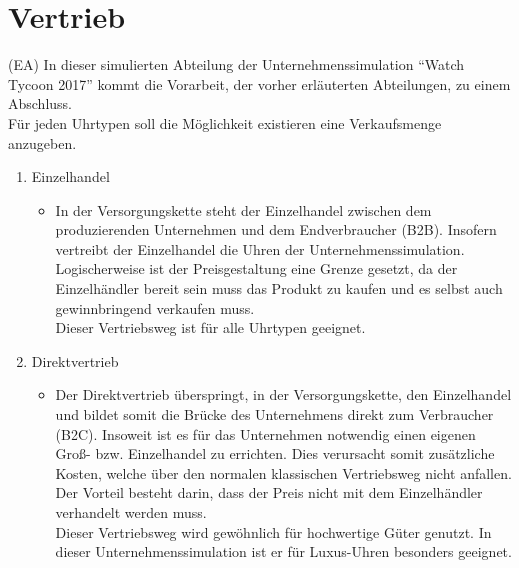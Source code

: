 \section{Vertrieb}
(EA) In dieser simulierten Abteilung der Unternehmenssimulation \enquote{Watch Tycoon 2017} kommt die Vorarbeit, der vorher erläuterten Abteilungen, zu einem Abschluss. \\
Für jeden Uhrtypen soll die Möglichkeit existieren eine Verkaufsmenge anzugeben. 
\begin{enumerate}
	\item Einzelhandel
\begin{itemize}
	\item In der Versorgungskette steht der Einzelhandel zwischen dem produzierenden Unternehmen und dem Endverbraucher (B2B). Insofern vertreibt der Einzelhandel die Uhren der Unternehmenssimulation. Logischerweise ist der Preisgestaltung eine Grenze gesetzt, da der Einzelhändler bereit sein muss das Produkt zu kaufen und es selbst auch gewinnbringend verkaufen muss. \\
	Dieser Vertriebsweg ist für alle Uhrtypen geeignet. 
\end{itemize}
	\item Direktvertrieb
\begin{itemize}
	\item Der Direktvertrieb überspringt, in der Versorgungskette, den Einzelhandel und bildet somit die Brücke des Unternehmens direkt zum Verbraucher (B2C). Insoweit ist es für das Unternehmen notwendig einen eigenen Groß- bzw. Einzelhandel zu errichten. Dies verursacht somit zusätzliche Kosten, welche über den normalen klassischen Vertriebsweg nicht anfallen. Der Vorteil besteht darin, dass der Preis nicht mit dem Einzelhändler verhandelt werden muss. \\
	Dieser Vertriebsweg wird gewöhnlich für hochwertige Güter genutzt. In dieser Unternehmenssimulation ist er für Luxus-Uhren besonders geeignet.
\end{itemize}
\end{enumerate}

